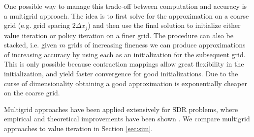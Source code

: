 One possible way to manage this trade-off between computation and accuracy is a multigrid approach. The idea is to first solve for the approximation on a coarse grid (e.g. grid spacing $2\Delta x_j$) and then use the final solution to initialize either value iteration or policy iteration on a finer grid. The procedure can also be stacked, i.e. given $m$ grids of increasing fineness we can produce approximations of increasing accuracy by using each as an initialization for the subsequent grid. This is only possible because contraction mappings allow great flexibility in the initialization, and yield faster convergence for good initializations. Due to the curse of dimensionality obtaining a good approximation is exponentially cheaper on the coarse grid. 

Multigrid approaches have been applied extensively for SDR problems, where empirical and theoretical improvements have been shown \cite{Alla2015, Chow1991}. We compare multigrid approaches to value iteration in Section \ref{sec:sim}.
